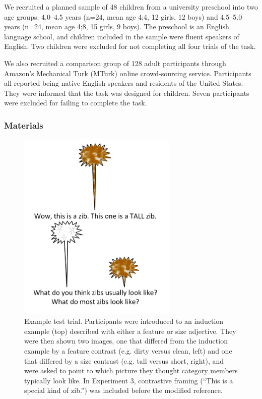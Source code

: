 \documentclass[man]{apa2}
\begin{document}
We recruited a planned sample of 48 children from a university preschool into two age groups: 4.0--4.5 years (n=24, mean age 4;4, 12 girls, 12 boys) and 4.5--5.0 years (n=24, mean age 4;8, 15 girls, 9 boys). The preschool is an English language school, and children included in the sample were fluent speakers of English. Two children were excluded for not completing all four trials of the task.

We also recruited a comparison group of 128 adult participants through Amazon's Mechanical Turk (MTurk) online crowd-sourcing service.  Participants all reported being native English speakers and residents of the United States. They were informed that the task was designed for children. Seven participants were excluded for failing to complete the task.  


\subsubsection{Materials}

\begin{figure}[t]
  \begin{center} 
    \includegraphics[width=3in]{figures/zib_demo.png} 
    \caption{\label{fig:inanimate_demo} Example test trial. Participants were introduced to an induction example (top) described with either a feature or size adjective. They were then shown two images, one that differed from the induction example by a feature contrast (e.g. dirty versus clean, left) and one that differed by a size contrast (e.g. tall versus short, right), and were asked to point to which picture they thought category members typically look like. In Experiment 3, contrastive framing (``This is a special kind of zib.'') was included before the modified reference. } 
  \end{center} 
\vspace{-10ex}
\end{figure}	
\end{document}

